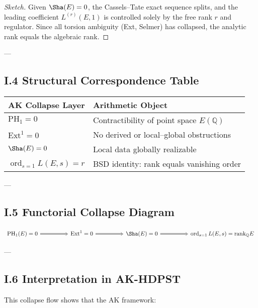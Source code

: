 \begin{proof}[Sketch]
Given \( \Sha(E) = 0 \), the Cassels–Tate exact sequence splits, and the leading coefficient \( L^{(r)}(E,1) \) is controlled solely by the free rank \( r \) and regulator.  
Since all torsion ambiguity (Ext, Selmer) has collapsed, the analytic rank equals the algebraic rank.
\end{proof}

---

\subsection*{I.4 Structural Correspondence Table}

\begin{center}
\begin{tabular}{ll}
\toprule
\textbf{AK Collapse Layer} & \textbf{Arithmetic Object} \\
\midrule
\( \mathrm{PH}_1 = 0 \)         & Contractibility of point space \( E(\mathbb{Q}) \) \\
\( \mathrm{Ext}^1 = 0 \)        & No derived or local–global obstructions \\
\( \Sha(E) = 0 \)              & Local data globally realizable \\
\( \operatorname{ord}_{s=1} L(E,s) = r \) & BSD identity: rank equals vanishing order \\
\bottomrule
\end{tabular}
\end{center}

---

\subsection*{I.5 Functorial Collapse Diagram}

\[
\begin{tikzcd}[row sep=large, column sep=huge]
\mathrm{PH}_1(E) = 0 \arrow[r, Rightarrow] & 
\mathrm{Ext}^1 = 0 \arrow[r, Rightarrow] & 
\Sha(E) = 0 \arrow[r, Rightarrow] & 
\operatorname{ord}_{s=1} L(E,s) = \mathrm{rank}_\mathbb{Q} E
\end{tikzcd}
\]

---

\subsection*{I.6 Interpretation in AK-HDPST}

This collapse flow shows that the AK framework:

